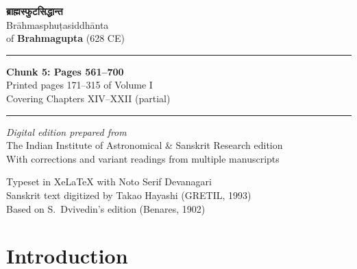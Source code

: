 \documentclass[11pt,a4paper]{article}
\newcommand{\shortline}{\noindent\rule{0.5\textwidth}{0.4pt}\par}
\newcommand{\dev}[1]{{\devanagarifont #1}}
\begin{document}
\begin{titlepage}
\centering
\vspace*{2cm}

{\Huge\bfseries\color{titlecolor} \dev{ब्राह्मस्फुटसिद्धान्त}}\\[0.8cm]
{\LARGE\color{sectioncolor} Brāhmasphuṭasiddhānta}\\[0.3cm]
{\large of \textbf{Brahmagupta} (628 CE)}\\[1.5cm]

\shortline

{\Large\bfseries\color{sectioncolor} Chunk 5: Pages 561–700}\\[0.3cm]
{\large Printed pages 171–315 of Volume I}\\[0.5cm]
{\normalsize Covering Chapters XIV–XXII (partial)}\\[1.5cm]

\shortline

\vspace{1cm}

{\small\textit{Digital edition prepared from}}\\
{\small The Indian Institute of Astronomical \& Sanskrit Research edition}\\[0.3cm]
{\small With corrections and variant readings from multiple manuscripts}\\[1cm]

\vfill

{\footnotesize Typeset in XeLaTeX with Noto Serif Devanagari}\\
{\footnotesize Sanskrit text digitized by Takao Hayashi (GRETIL, 1993)}\\
{\footnotesize Based on S.~Dvivedin's edition (Benares, 1902)}

\end{titlepage}

\tableofcontents
\newpage

\section*{Introduction}
\end{document}
